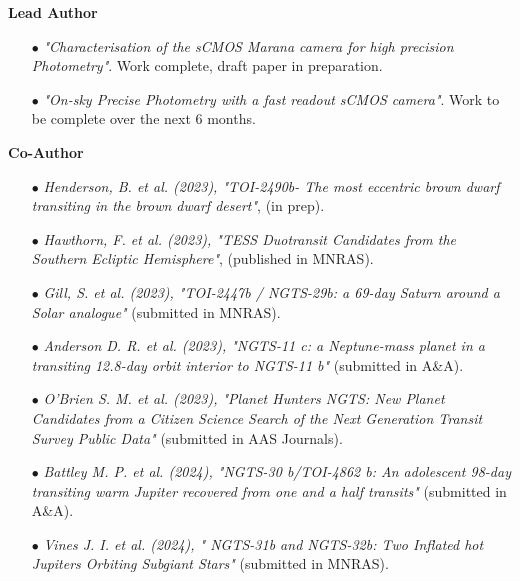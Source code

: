 \documentclass[10pt]{article}
\begin{document}
\textbf{\large{Lead Author}}
\\[-0.6cm]
\begin{itemize}[itemsep = -0.75 mm, leftmargin=*]
    \item[{\color[RGB]{10,0,254}$\bullet$}] \noindent \textit{"Characterisation of the sCMOS Marana camera for high precision Photometry"}.  Work complete, draft paper in preparation.
    \item[{\color[RGB]{10,0,254}$\bullet$}] \noindent \textit{"On-sky Precise Photometry with a fast readout sCMOS camera"}.  Work to be complete over the next 6 months.
\end{itemize}
\vspace{-2pt}
\textbf{\large{Co-Author}}  
\\[-0.6cm]
\begin{itemize}[itemsep = -0.75 mm, leftmargin=*]
    \item[{\color[RGB]{10,0,254}$\bullet$}] \noindent \textit{Henderson, B. et al. (2023),  "TOI-2490b- The most eccentric brown dwarf transiting in the brown dwarf desert"}, (in prep).
    \item[{\color[RGB]{10,0,254}$\bullet$}] \noindent \textit{Hawthorn, F. et al. (2023), "TESS Duotransit Candidates from the Southern Ecliptic Hemisphere"}, (published in MNRAS).
    \item[{\color[RGB]{10,0,254}$\bullet$}] \noindent \textit{Gill, S. et al. (2023), "TOI-2447b / NGTS-29b: a 69-day Saturn around a Solar analogue"} (submitted in MNRAS).
    \item[{\color[RGB]{10,0,254}$\bullet$}] \noindent \textit{Anderson D. R. et al. (2023), "NGTS-11 c: a Neptune-mass planet in a transiting 12.8-day orbit interior to NGTS-11 b"} (submitted in A\&A).
    \item[{\color[RGB]{10,0,254}$\bullet$}] \noindent \textit{O'Brien S. M. et al. (2023), "Planet Hunters NGTS: New Planet Candidates from a Citizen Science Search of the Next Generation Transit Survey Public Data"} (submitted in AAS Journals).
    \item[{\color[RGB]{10,0,254}$\bullet$}] \noindent \textit{Battley M. P. et al. (2024), "NGTS-30 b/TOI-4862 b: An adolescent 98-day transiting warm Jupiter recovered from one and a half transits"} (submitted in A\&A).
    \item[{\color[RGB]{10,0,254}$\bullet$}] \noindent \textit{Vines J. I. et al. (2024), "
    NGTS-31b and NGTS-32b: Two Inflated hot Jupiters Orbiting Subgiant Stars"} (submitted in MNRAS).
\end{itemize}
\end{document}
